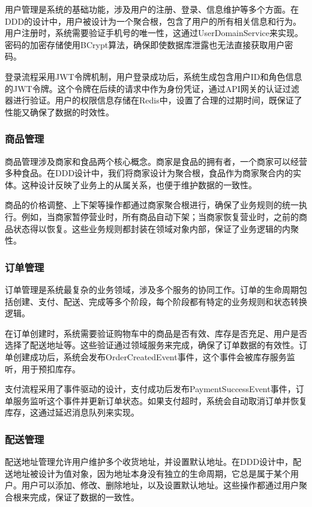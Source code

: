 \documentclass[a4paper,12pt]{article}
\begin{document}
用户管理是系统的基础功能，涉及用户的注册、登录、信息维护等多个方面。在DDD的设计中，用户被设计为一个聚合根，包含了用户的所有相关信息和行为。用户注册时，系统需要验证手机号的唯一性，这通过UserDomainService来实现。密码的加密存储使用BCrypt算法，确保即使数据库泄露也无法直接获取用户密码。

登录流程采用JWT令牌机制，用户登录成功后，系统生成包含用户ID和角色信息的JWT令牌。这个令牌在后续的请求中作为身份凭证，通过API网关的认证过滤器进行验证。用户的权限信息存储在Redis中，设置了合理的过期时间，既保证了性能又确保了数据的时效性。

\subsubsection{商品管理}

商品管理涉及商家和食品两个核心概念。商家是食品的拥有者，一个商家可以经营多种食品。在DDD设计中，我们将商家设计为聚合根，食品作为商家聚合内的实体。这种设计反映了业务上的从属关系，也便于维护数据的一致性。

商品的价格调整、上下架等操作都通过商家聚合根进行，确保了业务规则的统一执行。例如，当商家暂停营业时，所有商品自动下架；当商家恢复营业时，之前的商品状态得以恢复。这些业务规则都封装在领域对象内部，保证了业务逻辑的内聚性。

\subsubsection{订单管理}

订单管理是系统最复杂的业务领域，涉及多个服务的协同工作。订单的生命周期包括创建、支付、配送、完成等多个阶段，每个阶段都有特定的业务规则和状态转换逻辑。

在订单创建时，系统需要验证购物车中的商品是否有效、库存是否充足、用户是否选择了配送地址等。这些验证通过领域服务来完成，确保了订单数据的有效性。订单创建成功后，系统会发布OrderCreatedEvent事件，这个事件会被库存服务监听，用于预扣库存。

支付流程采用了事件驱动的设计，支付成功后发布PaymentSuccessEvent事件，订单服务监听这个事件并更新订单状态。如果支付超时，系统会自动取消订单并恢复库存，这通过延迟消息队列来实现。

\subsubsection{配送管理}

配送地址管理允许用户维护多个收货地址，并设置默认地址。在DDD设计中，配送地址被设计为值对象，因为地址本身没有独立的生命周期，它总是属于某个用户。用户可以添加、修改、删除地址，以及设置默认地址。这些操作都通过用户聚合根来完成，保证了数据的一致性。
\end{document}
